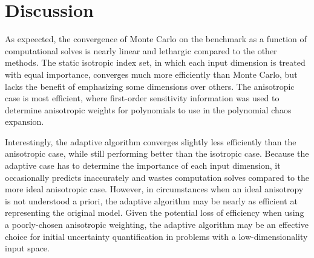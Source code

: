 \documentclass{anstrans} \usepackage{amsmath} \usepackage{amssymb}
\begin{document}
\section{Discussion}
As expeected, the convergence of Monte Carlo on the benchmark as a function of computational solves is nearly
linear and lethargic compared to the other methods.  The static isotropic index set, in which each input
dimension is treated with equal importance, converges much more efficiently than Monte Carlo, but lacks the
benefit of emphasizing some dimensions over others.  The anisotropic case is most efficient, where first-order
sensitivity information was used to determine anisotropic weights for polynomials to use in the polynomial
chaos expansion.  

Interestingly, the adaptive algorithm converges slightly less efficiently than the anisotropic case, while
still performing better than the isotropic case.  Because the adaptive case has to determine the importance of
each input dimension, it occasionally predicts inaccurately and wastes computation solves compared to the more
ideal anisotropic case.  However, in circumstances when an ideal anisotropy is not understood a priori, the
adaptive algorithm may be nearly as efficient at representing the original model.  Given the potential loss of
efficiency when using a poorly-chosen anisotropic weighting, the adaptive algorithm may be an effective choice
for initial uncertainty quantification in problems with a low-dimensionality input space.

{}  
\end{document}
